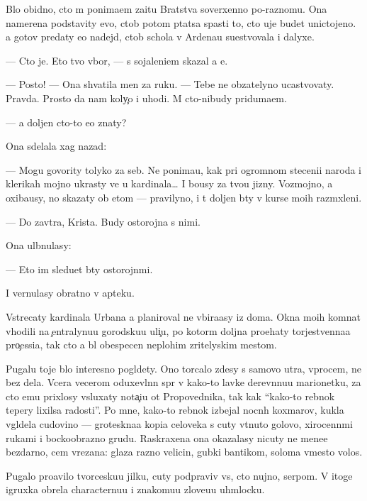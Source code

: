 \documentclass[10pt]{book}
\begin{document}
B{\yi}lo obidno, cto m{\yi} ponima{\y}em za{\x}itu Bratstva soverxenno po-raznomu. Ona namerena podstavity {\y}evo, ctob{\yi} potom p{\yi}tatsa spasti to, cto uje budet unictojeno. {\Y}a gotov predaty {\y}e{\y}o nadejd{\yi}, ctob{\yi} schola v Ardenau su{\x}estvovala i dalyxe.

— Cto je. Eto tvo{\y} v{\yi}bor, — s sojaleni{\y}em skazal {\y}a {\y}e{\y}.

— Posto{\y}! — Ona shvatila men{\ia} za ruku. — Tebe ne ob{\ia}zatelyno ucastvovaty. Pravda. Prosto da{\y} nam koly{\c}o i uhodi. M{\yi} cto-nibudy priduma{\y}em.

— {\Y}a doljen cto-to {\y}e{\x}o znaty?

Ona sdelala xag nazad:

— Mogu govority tolyko za seb{\ia}. Ne ponima{\y}u, kak pri ogromnom steceni{\y}i na\-ro\-da i klerikah mojno ukrasty ve{\x} u kardinala… I bo{\y}usy za tvo{\y}u jizny. Voz\-moj\-no, {\y}a oxiba{\y}usy, no skazaty ob etom — pravilyno, i t{\yi} doljen b{\yi}ty v kurse mo{\y}ih razm{\yi}xleni{\y}.

— Do zavtra, Krista. Budy ostorojna s nimi.

Ona ul{\yi}bnulasy:

— Eto im sledu{\y}et b{\yi}ty ostorojn{\yi}mi.

I vernulasy obratno v apteku.

Vstrecaty kardinala Urbana {\y}a planiroval ne v{\yi}bira{\y}asy iz doma. Okna mo{\y}ih komnat v{\yi}hodili na {\c}entralynu{\y}u gorodsku{\y}u uli{\c}u, po kotor{\yi}m doljna pro{\y}ehaty torjestvenna{\y}a pro{\c}essi{\y}a, tak cto {\y}a b{\yi}l obespecen neplohim zritelyskim mestom.

Pugalu toje b{\yi}lo interesno pogl{\ia}dety. Ono torcalo zdesy s samovo utra, vprocem, ne bez dela. Vcera vecerom oduxevl{\e}nn{\yi}{\y} sp{\e}r v kako{\y}-to lavke derev{\ia}nnu{\y}u marionetku, za cto {\y}emu pri\-xlosy v{\yi}sluxaty nota{\c}i{\y}u ot Pro\-po\-ved\-nika, tak kak ``kako{\y}-to reb{\e}nok tepery lixilsa radosti''. Po mne, kako{\y}-to reb{\e}nok izbejal nocn{\yi}h koxmarov, kukla v{\yi}gl{\ia}dela cudovi{\x}no — groteskna{\y}a kopi{\y}a celoveka s cuty v{\yi}t{\ia}nuto{\y} go\-lo\-vo{\y}, xirocenn{\yi}mi rukami i bockoobrazno{\y} grud{\y}u. Raskraxena ona okazalasy nicuty ne mene{\y}e bezdarno, cem v{\yi}rezana: glaza razno{\y} velicin{\yi}, gubki bantikom, soloma vmesto volos.

Pugalo pro{\y}avilo tvorcesku{\y}u jilku, cuty podpraviv vs{\e}, cto nujno, serpom. V itoge igruxka obrela characternu{\y}u i znakomu{\y}u zlove{\x}u{\y}u uhm{\yi}locku.
\end{document}
